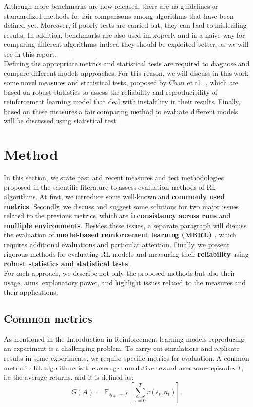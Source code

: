 \documentclass{article}
\DeclareMathOperator{\EX}{\mathbb{E}}%
\begin{document}
Although more benchmarks are now released, there are no guidelines or standardized methods for fair comparisons among algorithms that have been defined yet. Moreover, if poorly tests are carried out, they can lead to misleading results. In addition, benchmarks are also used improperly and in a naive way for comparing different algorithms, indeed they should be exploited better, as we will see in this report.\\
Defining the appropriate metrics and statistical tests are required to diagnose and compare different models approaches.
For this reason, we will discuss in this work some novel measures and statistical tests, proposed by Chan et al.~\cite{GoogleMeasure}, which are based on robust statistics to assess the reliability and reproducibility of reinforcement learning model that deal with instability in their results. Finally, based on these measures a fair comparing method to evaluate different models will be discussed using statistical test.
\section{Method}
In this section, we state past and recent measures and test methodologies proposed in the scientific literature to assess evaluation methods of RL algorithms. At first, we introduce some well-known and \textbf{commonly used metrics}. Secondly, we discuss and suggest some solutions for two major issues related to the previous metrics, which are \textbf{inconsistency across runs} and \textbf{multiple environments}. Besides these issues, a separate paragraph will discuss the evaluation of \textbf{model-based reinforcement learning (MBRL)}~\cite{MBRL1}, which requires additional evaluations and particular attention. Finally, we present rigorous methods for evaluating RL models and measuring their \textbf{reliability} using \textbf{robust statistics and statistical tests}.\\
For each approach, we describe not only the proposed methods but also their usage, aims, explanatory power, and highlight issues related to the measures and their applications.
\subsection{Common metrics}
As mentioned in the Introduction in Reinforcement learning models reproducing an experiment is a challenging problem. To carry out simulations and replicate results in some experiments, we require specific metrics for evaluation.
A common metric in RL algorithms is the average cumulative reward over some episodes $T$, i.e the average returns, and it is defined as:	
\begin{equation}
G(A) = \EX_{s_{t+1} \sim f} \left[\sum_{t=0}^{T} r(s_t, a_t)\right].	
\end{equation}
\end{document}
